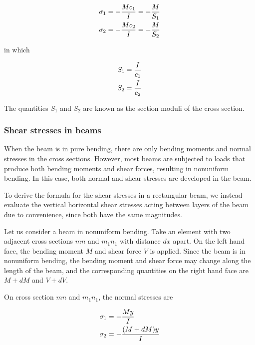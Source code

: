 \documentclass[a4paper,openany,nobib]{tufte-book}
\begin{document}
\begin{gather}
\label{eqn: section modulus}
  \sigma _1 =  - \frac{Mc_1}{I} =  - \frac{M}{S_1} \hfill \\
  \sigma _2 =  - \frac{Mc_2}{I} =  - \frac{M}{S_2} \hfill \\ 
\end{gather}

in which

$$\begin{gathered}
  S_1 = \frac{I}{c_1} \hfill \\
  S_2 = \frac{I}{c_2} \hfill \\ 
\end{gathered}$$

The quantities \(S_1\) and \(S_2\) are known as the section moduli of the
cross section.

\subsubsection{Shear stresses in beams}
\label{shear-stresses-in-beams}
When the beam is in pure bending, there are only bending moments and
normal stresses in the cross sections. However, most beams are subjected
to loads that produce both bending moments and shear forces, resulting
in nonuniform bending. In this case, both normal and shear stresses are
developed in the beam.

To derive the formula for the shear stresses in a rectangular beam, we
instead evaluate the vertical horizontal shear stresses acting between
layers of the beam due to convenience, since both have the same
magnitudes.

Let us consider a beam in nonuniform bending. Take an element with two
adjacent cross sections \(mn\) and \(m_1n_1\) with distance \(dx\) apart. On
the left hand face, the bending moment \(M\) and shear force \(V\) is
applied. Since the beam is in nonuniform bending, the bending moment and
shear force may change along the length of the beam, and the
corresponding quantities on the right hand face are \(M + dM\) and
\(V + dV\).


On cross section \(mn\) and \(m_1n_1\), the normal stresses are

$$\begin{gathered}
  \sigma _1 =  - \frac{My}{I} \hfill \\
  \sigma _2 =  - \frac{(M + dM)y}{I} \hfill \\ 
\end{gathered}$$
\end{document}
